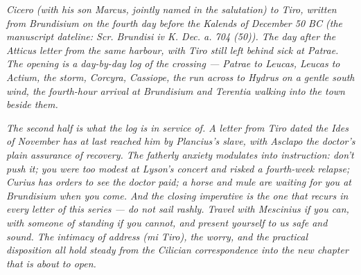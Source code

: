 
\textit{Cicero (with his son Marcus, jointly named in the
salutation) to Tiro, written from Brundisium on the fourth day
before the Kalends of December 50 BC (the manuscript dateline:
\textit{Scr. Brundisi iv K. Dec. a. 704 (50)}). The day after
the Atticus letter from the same harbour, with Tiro still left
behind sick at Patrae. The opening is a day-by-day log of the
crossing --- Patrae to Leucas, Leucas to Actium, the storm,
Corcyra, Cassiope, the run across to Hydrus on a gentle south
wind, the fourth-hour arrival at Brundisium and Terentia
walking into the town beside them.}

\textit{The second half is what the log is in service of. A
letter from Tiro dated the Ides of November has at last
reached him by Plancius's slave, with Asclapo the doctor's
plain assurance of recovery. The fatherly anxiety modulates
into instruction: don't push it; you were too modest at
Lyson's concert and risked a fourth-week relapse; Curius has
orders to see the doctor paid; a horse and mule are waiting
for you at Brundisium when you come. And the closing
imperative is the one that recurs in every letter of this
series --- do not sail rashly. Travel with Mescinius if you
can, with someone of standing if you cannot, and present
yourself to us safe and sound. The intimacy of address
(\emph{mi Tiro}), the worry, and the practical disposition
all hold steady from the Cilician correspondence into the
new chapter that is about to open.}
